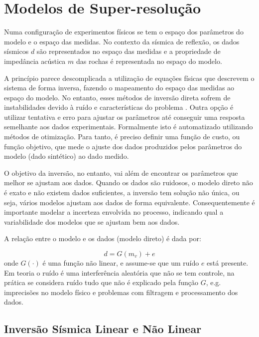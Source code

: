 \chapter{Modelos de Super-resolução}
\label{cap:2modelosInversao}


Numa configuração de experimentos físicos se tem o espaço dos parâmetros do
modelo e o espaço das medidas. No contexto da sísmica de reflexão, os dados
sísmicos $d$ são representados no espaço das medidas e a propriedade de
impedância acústica $m$ das rochas é representada no espaço do modelo.

A princípio parece descomplicada a utilização de equações físicas que descrevem
o sistema de forma inversa, fazendo o mapeamento do espaço das medidas ao espaço
do modelo. No entanto, esses métodos de inversão direta sofrem de instabilidades
devido à ruído e características do problema \citep[p. 50]{sen_livro}. Outra
opção é utilizar tentativa e erro para ajustar os parâmetros até conseguir uma
resposta semelhante aos dados experimentais. Formalmente isto é automatizado
utilizando métodos de otimização. Para tanto, é preciso definir uma função de
custo, ou função objetivo, que mede o ajuste dos dados produzidos pelos
parâmetros do modelo (dado sintético) ao dado medido.

O objetivo da inversão, no entanto, vai além de encontrar os parâmetros que
melhor se ajustam aos dados. Quando os dados são ruidosos, o modelo direto não é
exato e não existem dados suficientes, a inversão tem solução não única, ou
seja, vários modelos ajustam aos dados de forma equivalente. Consequentemente é
importante modelar a incerteza envolvida no processo, indicando qual a
variabilidade dos modelos que se ajustam bem aos dados.

A relação entre o modelo e os dados (modelo direto) é dada por:

\begin{equation}
d = G(m_v) + e
\end{equation}
onde $G(\cdot)$ é uma função não linear, e assume-se que um ruído $e$ está
presente. Em teoria o ruído é uma interferência aleatória que não se tem
controle, na prática se considera ruído tudo que não é explicado pela função
$G$, e.g. imprecisões no modelo físico e problemas com filtragem e processamento
dos dados.

\section{Inversão Sísmica Linear e Não Linear}

